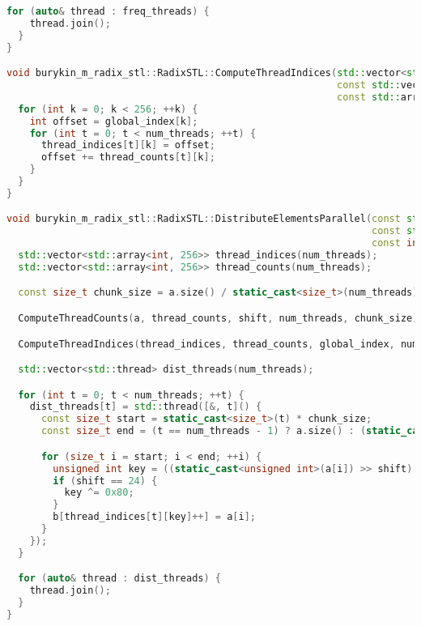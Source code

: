 \documentclass[12pt]{article}
\begin{document}
\begin{lstlisting}[language=C++]
  for (auto& thread : freq_threads) {
    thread.join();
  }
}

void burykin_m_radix_stl::RadixSTL::ComputeThreadIndices(std::vector<std::array<int, 256>>& thread_indices,
                                                         const std::vector<std::array<int, 256>>& thread_counts,
                                                         const std::array<int, 256>& global_index, int num_threads) {
  for (int k = 0; k < 256; ++k) {
    int offset = global_index[k];
    for (int t = 0; t < num_threads; ++t) {
      thread_indices[t][k] = offset;
      offset += thread_counts[t][k];
    }
  }
}

void burykin_m_radix_stl::RadixSTL::DistributeElementsParallel(const std::vector<int>& a, std::vector<int>& b,
                                                               const std::array<int, 256>& global_index,
                                                               const int shift, int num_threads) {
  std::vector<std::array<int, 256>> thread_indices(num_threads);
  std::vector<std::array<int, 256>> thread_counts(num_threads);

  const size_t chunk_size = a.size() / static_cast<size_t>(num_threads);

  ComputeThreadCounts(a, thread_counts, shift, num_threads, chunk_size);

  ComputeThreadIndices(thread_indices, thread_counts, global_index, num_threads);

  std::vector<std::thread> dist_threads(num_threads);

  for (int t = 0; t < num_threads; ++t) {
    dist_threads[t] = std::thread([&, t]() {
      const size_t start = static_cast<size_t>(t) * chunk_size;
      const size_t end = (t == num_threads - 1) ? a.size() : (static_cast<size_t>(t) + 1) * chunk_size;

      for (size_t i = start; i < end; ++i) {
        unsigned int key = ((static_cast<unsigned int>(a[i]) >> shift) & 0xFFU);
        if (shift == 24) {
          key ^= 0x80;
        }
        b[thread_indices[t][key]++] = a[i];
      }
    });
  }

  for (auto& thread : dist_threads) {
    thread.join();
  }
}
\end{lstlisting}
\end{document}
